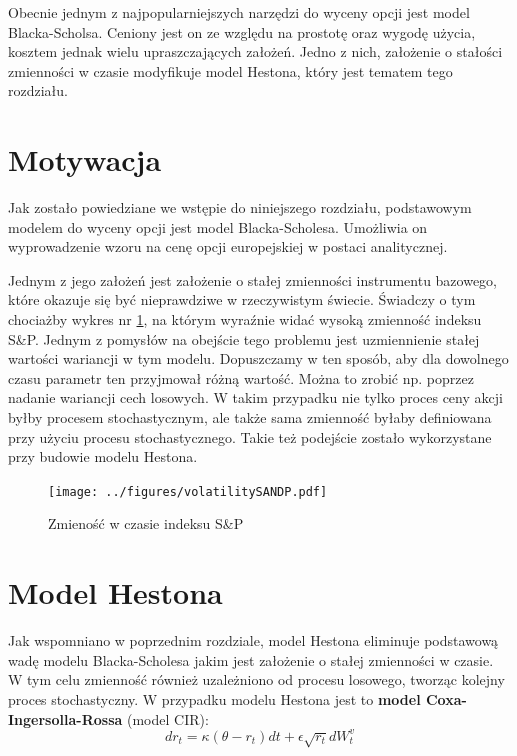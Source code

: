 \documentclass{pracamgr}
\begin{document}
Obecnie jednym z najpopularniejszych narzędzi do wyceny opcji jest model Blacka-Scholsa. Ceniony jest on ze względu na prostotę oraz wygodę użycia, kosztem jednak wielu upraszczających założeń. 
Jedno z nich, założenie o stałości zmienności w czasie modyfikuje model Hestona, który jest 
tematem tego rozdziału.


\section{Motywacja} 
Jak zostało powiedziane we wstępie do niniejszego rozdziału, podstawowym modelem do wyceny opcji jest model Blacka-Scholesa.
Umożliwia on wyprowadzenie wzoru na cenę opcji europejskiej w postaci analitycznej. 

Jednym z jego założeń jest założenie o stałej zmienności instrumentu bazowego, które okazuje się
być nieprawdziwe w rzeczywistym świecie. Świadczy o tym chociażby
wykres nr \ref{fig:vix}, na którym wyraźnie widać wysoką zmienność indeksu S\&P. Jednym z pomysłów na
obejście tego problemu jest uzmiennienie stałej wartości wariancji w tym modelu. Dopuszczamy w ten 
sposób, aby dla dowolnego czasu parametr ten przyjmował różną wartość. Można to zrobić np. poprzez nadanie wariancji cech losowych. W takim przypadku nie tylko proces ceny akcji byłby procesem stochastycznym, ale także sama zmienność byłaby definiowana przy użyciu procesu stochastycznego. Takie też podejście zostało wykorzystane przy budowie modelu Hestona.



\begin{figure}
  \centering  
  \texttt{[image: ../figures/volatilitySANDP.pdf]}
  \caption{Zmieność w czasie indeksu S\&P}\label{fig:vix}
\end{figure} 

\section{Model Hestona}
Jak wspomniano w poprzednim rozdziale, model Hestona eliminuje podstawową wadę modelu Blacka-Scholesa jakim jest założenie o stałej zmienności w czasie.
W tym celu zmienność również uzależniono od procesu losowego, tworząc kolejny proces stochastyczny. W przypadku modelu Hestona jest to \textbf{model Coxa-Ingersolla-Rossa} \cite{CoxIngersollRoss} (model CIR):
\begin{equation}
dr_t  = \kappa (\theta  - r_t)dt + \epsilon \sqrt{r_t} dW_t^v 
\end{equation}
\end{document}
